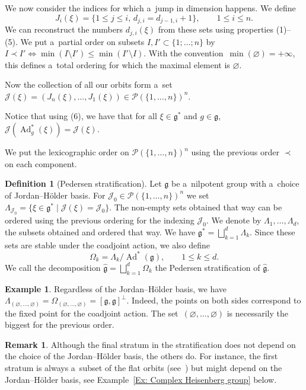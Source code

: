 \documentclass[10pt,a4paper]{article}
\newcommand{\Ad}{\operatorname{Ad}} %
\newcommand{\g}{\mathfrak{g}} %
\numberwithin{equation}{section}
\theoremstyle{definition}
\newtheorem{mydef}[thm]{Definition}
\newtheorem{ex}[thm]{Example}
\newtheorem{rem}[thm]{Remark}
\begin{document}
We now consider the indices for which a~jump in dimension happens. We define
\[J_i(\xi) = \{1\leq j \leq i,\, d_{j,i} = d_{j-1,i} +1 \},\qquad 1\leq i \leq n.\]
We can reconstruct the numbers $d_{j,i}(\xi)$ from these sets using properties (1)--(5). We put a~partial order on subsets $I, I' \subset \{1;\dots;n\}$ by $I\prec I' \Leftrightarrow \min(I\setminus I') \leq \min(I' \setminus I)$.
With the convention~${\min(\varnothing) = +\infty}$, this defines a~total ordering for which the maximal element is $\varnothing$.

Now the collection of all our orbits form a~set $\mathcal{J}(\xi)= (J_n(\xi),\dots,J_1(\xi)) \in \mathcal{P}(\{1,\dots,n\})^n$.

Notice that using (6), we have that for all $\xi \in \g^*$ and $g\in \g$, $\mathcal{J}(\Ad^*_g(\xi)) = \mathcal{J}(\xi)$.

We put the lexicographic order on $\mathcal{P}(\{1,\dots,n\})^n$ using the previous order $\prec$ on each component.

\begin{mydef}[Pedersen stratification]
 Let $\g$ be a~nilpotent group with a~choice of Jordan--H\"older basis. For $\mathcal{J}_0 \in \mathcal{P}(\{1,\dots,n\})^n$ we set $\Lambda_{\mathcal{J}_0} = \{\xi \in \g^* \mid \mathcal{J}(\xi) = \mathcal{J}_0\}$. The non-empty sets obtained that way can be ordered using the previous ordering for the indexing $\mathcal{J}_0$. We denote by $\Lambda_1, \dots, \Lambda_d$,
 the subsets obtained and ordered that way. We have $\g^* = \bigsqcup_{k = 1}^d \Lambda_k$. Since these sets are stable under the coadjoint action, we also define
 \[\Omega_k =  {\Lambda_k}/{\Ad^*(\g)},\qquad 1\leq k \leq d.\]
 We call the decomposition $\widehat{\g} = \bigsqcup_{k = 1}^d \Omega_k$ the Pedersen stratification of $\widehat{\g}$.
\end{mydef}

\begin{ex}
 Regardless of the Jordan--H\"older basis, we have $\Lambda_{(\varnothing,\dots,\varnothing)} = \Omega_{(\varnothing,\dots,\varnothing)} = [\g,\g]^{\perp}$.
 Indeed, the points on both sides correspond to the fixed point for the coadjoint action. The set~${(\varnothing,\dots,\varnothing)}$ is necessarily the biggest for the previous order.
\end{ex}

\begin{rem}
 Although the final stratum in the stratification does not depend on the choice of the Jordan--H\"older basis, the others do. For instance, the first stratum is always a~subset of the flat orbits (see~\cite{GoffengKuzmin}) but might depend on the Jordan--H\"older basis, see Example~\ref{Ex: Complex Heisenberg group} below.
\end{rem}
\end{document}
